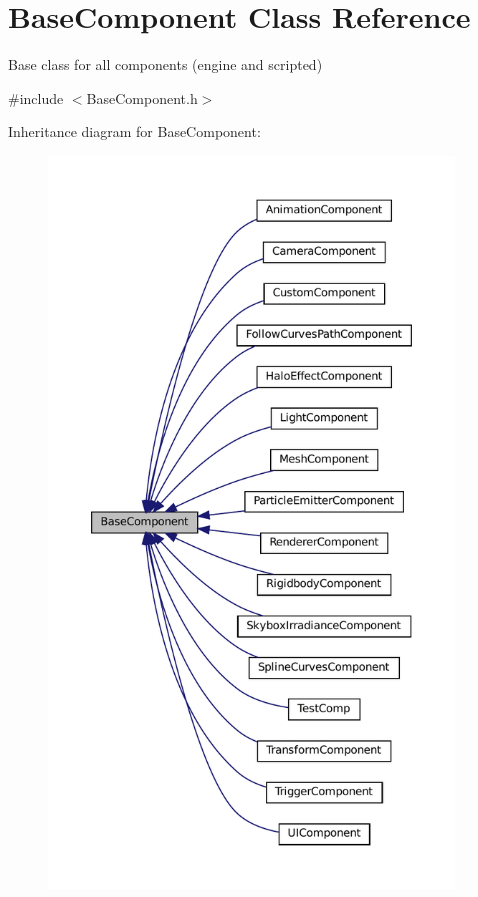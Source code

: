 \hypertarget{classBaseComponent}{}\section{Base\+Component Class Reference}
\label{classBaseComponent}


Base class for all components (engine and scripted)  




{\ttfamily \#include $<$Base\+Component.\+h$>$}



Inheritance diagram for Base\+Component\+:
\nopagebreak
\begin{figure}[H]
\begin{center}
\leavevmode
\includegraphics[height=550pt]{classBaseComponent__inherit__graph}
\end{center}
\end{figure}


